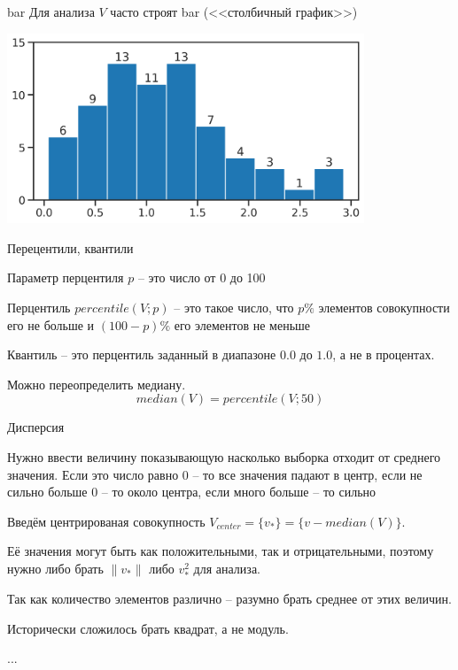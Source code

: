 \begin{frame}{bar}
 	Для анализа $V$ часто строят bar (<<столбичный график>>)
 	
 	\includegraphics[width=0.8\textwidth]{./../pic/bar_example.png}
 	
 	
\end{frame}



\begin{frame}{Перецентили, квантили}
	
	Параметр перцентиля $p$ -- это число от 0 до 100
	
	Перцентиль $percentile(V;p)$ -- это такое число, что $p\%$ элементов совокупности его не больше 
	и $(100-p)\%$ его элементов не меньше
	
	
	Квантиль -- это перцентиль заданный в диапазоне $0.0$ до $1.0$, а не в процентах.
	
	Можно переопределить медиану. 
	\begin{equation}
		median(V) = percentile(V;50)
	\end{equation}
\end{frame}


\begin{frame}{Дисперсия}

	
	Нужно ввести величину показывающую насколько выборка отходит от среднего значения. Если это число равно 0 -- то все значения падают в центр, 
	если не сильно больше 0 -- то около центра, если много больше -- то сильно 
	
	Введём центрированая совокупность $V_{center} = \{ v_{*}\} = \{v - median(V)\}$.
	
	Её значения могут быть как положительными, так и отрицательными, поэтому нужно либо брать $ \lVert v_* \rVert$ либо $v_*^2$ для анализа.
	
	Так как количество элементов различно -- разумно брать среднее от этих величин.
	
	Исторически сложилось брать квадрат, а не модуль.
	
	...
	
\end{frame}

